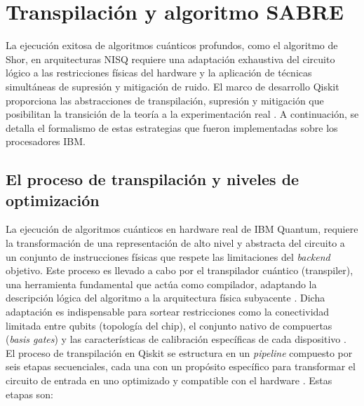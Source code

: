 \documentclass[12pt, spanish]{book}
\begin{document}
\section{Transpilación y algoritmo SABRE}
\label{sec:transpilacionysabre}

La ejecución exitosa de algoritmos cuánticos profundos, como el algoritmo de Shor, en arquitecturas NISQ requiere una adaptación exhaustiva del circuito lógico a las restricciones físicas del hardware y la aplicación de técnicas simultáneas de supresión y mitigación de ruido. El marco de desarrollo Qiskit proporciona las abstracciones de transpilación, supresión y mitigación que posibilitan la transición de la teoría a la experimentación real \cite{IBMqiskit, IBMcloud2025}. A continuación, se detalla el formalismo de estas estrategias que fueron implementadas sobre los procesadores IBM.

\subsection{El proceso de transpilación y niveles de optimización}

La ejecución de algoritmos cuánticos en hardware real de IBM Quantum, requiere la transformación de una representación de alto nivel y abstracta del circuito a un conjunto de instrucciones físicas que respete las limitaciones del \textit{backend} objetivo. Este proceso es llevado a cabo por el transpilador cuántico (transpiler), una herramienta fundamental que actúa como compilador, adaptando la descripción lógica del algoritmo a la arquitectura física subyacente \cite{IBM_transpile_2025}. Dicha adaptación es indispensable para sortear restricciones como la conectividad limitada entre qubits (topología del chip), el conjunto nativo de compuertas (\textit{basis gates}) y las características de calibración específicas de cada dispositivo \cite{IBM_defaults_2025}.\\

El proceso de transpilación en Qiskit se estructura en un \textit{pipeline} compuesto por seis etapas secuenciales, cada una con un propósito específico para transformar el circuito de entrada en uno optimizado y compatible con el hardware \cite{IBM_stages_2025}. Estas etapas son:
\end{document}
